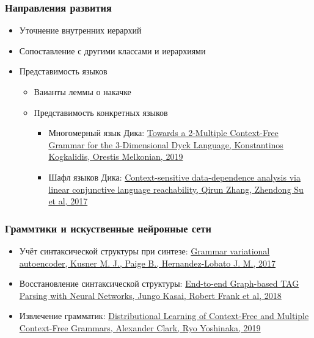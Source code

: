 \documentclass{beamer}
\begin{document}
\begin{frame}[fragile]
  
  \frametitle{Направления развития}
  
  \begin{itemize}
    \item Уточнение внутренних иерархий
    \item Сопоставление с другими классами и иерархиями
    \item Представимость языков
    \begin{itemize}
      \item Ваианты леммы о накачке
      \item Представимость конкретных языков
      \begin{itemize}
        \item Многомерный язык Дика: \href{https://link.springer.com/chapter/10.1007/978-3-662-59620-3_5}{Towards a 2-Multiple Context-Free Grammar for the 3-Dimensional Dyck Language, Konstantinos Kogkalidis, Orestis Melkonian, 2019} 
        \item Шафл языков Дика: \href{https://dl.acm.org/doi/10.1145/3093333.3009848}{Context-sensitive data-dependence analysis via linear conjunctive language reachability, Qirun Zhang, Zhendong Su et al, 2017}
      \end{itemize}
    \end{itemize}    
  \end{itemize}  

\end{frame}

\begin{frame}[fragile]
  
  \frametitle{Граммтики и искуственные нейронные сети}
  
\begin{itemize}
    \item Учёт синтаксической структуры при синтезе: \href{https://dl.acm.org/doi/10.5555/3305381.3305582}{Grammar variational autoencoder, Kusner M. J., Paige B., Hernandez-Lobato J. M., 2017}
    \item Восстановление синтаксической структуры: \href{https://arxiv.org/abs/1804.06610}{End-to-end Graph-based TAG Parsing with Neural Networks, Jungo Kasai, Robert Frank et al, 2018}
    \item Извлечение грамматик: \href{https://link.springer.com/chapter/10.1007/978-3-662-48395-4_6}{Distributional Learning of Context-Free and Multiple Context-Free Grammars, Alexander Clark, Ryo Yoshinaka, 2019}
  \end{itemize}  


\end{frame}
\end{document}
